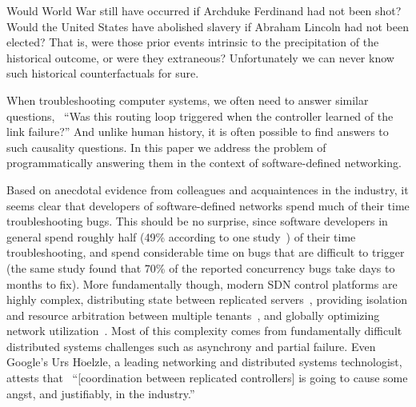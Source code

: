 
Would World War  still have occurred if Archduke Ferdinand had not been
shot? Would the United States have abolished slavery if Abraham Lincoln had
not been elected? That is,
were those prior events intrinsic to the
precipitation of the historical outcome, or
were they extraneous? Unfortunately we can never know such
historical counterfactuals for sure.

When troubleshooting computer systems, we often need to answer similar questions,
\eg~``Was this routing loop triggered when the controller learned of the link failure?''
And unlike human history, it is often possible to find answers to such
causality questions. In this paper we address the problem of programmatically answering
them in the context of software-defined networking.


Based on anecdotal evidence from colleagues and acquaintences in the industry, it seems clear that
developers of software-defined networks spend much of their time
troubleshooting bugs. This should be no surprise, since software developers in
general spend roughly half (49\% according to one
study~\cite{msoft_concurrency}) of their time troubleshooting, and spend
considerable time on bugs that are difficult to trigger
(the same study found that 70\% of the reported concurrency bugs
take days to months to fix).
More fundamentally though, modern SDN control platforms are highly complex,
distributing state between replicated
servers~\cite{floodlight},
providing isolation and resource arbitration between multiple
tenants~\cite{Casado:2010:VNF:1921151.1921162}, and
globally optimizing network utilization~\cite{urs}.
Most of this complexity comes from
fundamentally difficult distributed systems challenges such as asynchrony and
partial failure. Even Google's Urs H$\ddot{\mathrm{o}}$elzle, a leading
networking and distributed systems technologist,
attests that~\cite{urs} ``[coordination between replicated controllers] is going to
cause some angst, and justifiably, in the industry.''

